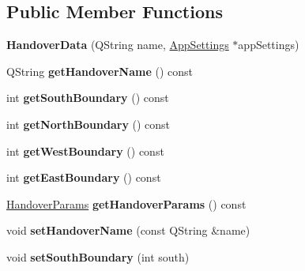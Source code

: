 \subsection*{Public Member Functions}
\begin{DoxyCompactItemize}
\item 
{\bfseries Handover\+Data} (Q\+String name, \hyperlink{class_app_settings}{App\+Settings} $\ast$app\+Settings)\hypertarget{class_handover_data_a0ebdcdf3e6e19113905b1d5d012f6a0b}{}\label{class_handover_data_a0ebdcdf3e6e19113905b1d5d012f6a0b}

\item 
Q\+String {\bfseries get\+Handover\+Name} () const \hypertarget{class_handover_data_afc88231951f57e84f261d0f29f9ed761}{}\label{class_handover_data_afc88231951f57e84f261d0f29f9ed761}

\item 
int {\bfseries get\+South\+Boundary} () const \hypertarget{class_handover_data_aa7240bb71bd2b3f13ab0f4ff00c1c779}{}\label{class_handover_data_aa7240bb71bd2b3f13ab0f4ff00c1c779}

\item 
int {\bfseries get\+North\+Boundary} () const \hypertarget{class_handover_data_a3b68a3562f9c37188b21eee29ba3f9a7}{}\label{class_handover_data_a3b68a3562f9c37188b21eee29ba3f9a7}

\item 
int {\bfseries get\+West\+Boundary} () const \hypertarget{class_handover_data_aadcfee4d7b0c6c4091c913f4da6997de}{}\label{class_handover_data_aadcfee4d7b0c6c4091c913f4da6997de}

\item 
int {\bfseries get\+East\+Boundary} () const \hypertarget{class_handover_data_afb7972ace81cf60fc32e91d94f276c1b}{}\label{class_handover_data_afb7972ace81cf60fc32e91d94f276c1b}

\item 
\hyperlink{struct_handover_params}{Handover\+Params} {\bfseries get\+Handover\+Params} () const \hypertarget{class_handover_data_a2d2c8f3f0865c5d97e2f6cca132db310}{}\label{class_handover_data_a2d2c8f3f0865c5d97e2f6cca132db310}

\item 
void {\bfseries set\+Handover\+Name} (const Q\+String \&name)\hypertarget{class_handover_data_aa2ebdd4cdea80d68d74ed11e76ab7b5d}{}\label{class_handover_data_aa2ebdd4cdea80d68d74ed11e76ab7b5d}

\item 
void {\bfseries set\+South\+Boundary} (int south)\hypertarget{class_handover_data_a7206dedee68b4bb70a65f561bf499e5c}{}\label{class_handover_data_a7206dedee68b4bb70a65f561bf499e5c}


\end{DoxyCompactItemize}
